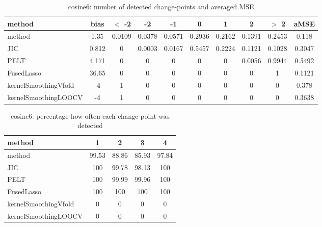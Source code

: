 \begin{table}[ht]
\centering
\begin{tabular}{l|c|ccccccc|c}
  \hline
method & bias & $<$ -2 & -2 & -1 & 0 & 1 & 2 & $>$ 2 & aMSE \\ 
  \hline
method &  1.35 & 0.0109 & 0.0378 & 0.0571 & 0.2936 & 0.2162 & 0.1391 & 0.2453 & 0.118 \\ 
  JIC & 0.812 &     0 & 0.0003 & 0.0167 & 0.5457 & 0.2224 & 0.1121 & 0.1028 & 0.3047 \\ 
  PELT & 4.171 &     0 &     0 &     0 &     0 &     0 & 0.0056 & 0.9944 & 0.5492 \\ 
  FusedLasso & 36.65 &     0 &     0 &     0 &     0 &     0 &     0 &     1 & 0.1121 \\ 
  kernelSmoothingVfold &    -4 &     1 &     0 &     0 &     0 &     0 &     0 &     0 & 0.378 \\ 
  kernelSmoothingLOOCV &    -4 &     1 &     0 &     0 &     0 &     0 &     0 &     0 & 0.3638 \\ 
   \hline
\end{tabular}
\caption{cosine6: number of detected change-points and averaged MSE} 
\label{tab:cosine6Njumps}
\end{table}
\begin{table}[ht]
\centering
\begin{tabular}{l|cccc}
  \hline
method & 1 & 2 & 3 & 4 \\ 
  \hline
method &  99.53 &  88.86 &  85.93 &  97.84 \\ 
  JIC &    100 &  99.78 &  98.13 &    100 \\ 
  PELT &    100 &  99.99 &  99.96 &    100 \\ 
  FusedLasso &    100 &    100 &    100 &    100 \\ 
  kernelSmoothingVfold &      0 &      0 &      0 &      0 \\ 
  kernelSmoothingLOOCV &      0 &      0 &      0 &      0 \\ 
   \hline
\end{tabular}
\caption{cosine6: percentage how often each change-point was detected} 
\label{tab:cosine6Detections}
\end{table}
